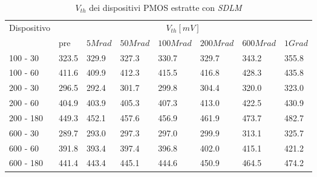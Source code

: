 \documentclass[12pt, letterpaper]{book}
\begin{document}
\begin{table}[H]
  \renewcommand{\arraystretch}{1.3}
  \begin{tabular}{m{2cm} m{0.8cm} m{1.1cm} m{1.3cm} m{1.5cm} m{1.5cm} m{1.5cm} m{1cm}}
    \toprule
    \multirow{2}{*}{Dispositivo} & \multicolumn{7}{c}{$V_{th} [mV] $}                                                                    \\
    \cmidrule{2-8}
                                 & pre                                & $5Mrad$ & $50Mrad$ & $100Mrad$ & $200Mrad$ & $600Mrad$ & $1Grad$ \\
    \midrule
    100 - 30                     & 323.5                              & 329.9   & 327.3    & 330.7     & 329.7     & 343.2     & 355.8   \\
    \hline
    100 - 60                     & 411.6                              & 409.9   & 412.3    & 415.5     & 416.8     & 428.3     & 435.8   \\
    \hline
    200 - 30                     & 296.5                              & 292.4   & 301.7    & 299.8     & 304.4     & 320.0     & 323.0   \\
    \hline
    200 - 60                     & 404.9                              & 403.9   & 405.3    & 407.3     & 413.0     & 422.5     & 430.9   \\
    \hline
    200 - 180                    & 449.3                              & 452.1   & 457.6    & 456.9     & 461.9     & 473.7     & 482.7   \\
    \hline
    600 - 30                     & 289.7                              & 293.0   & 297.3    & 297.0     & 299.9     & 313.1     & 325.7   \\
    \hline
    600 - 60                     & 391.8                              & 393.4   & 397.4    & 396.8     & 402.0     & 415.1     & 421.2   \\
    \hline
    600 - 180                    & 441.4                              & 443.4   & 445.1    & 444.6     & 450.9     & 464.5     & 474.2   \\
    \bottomrule
  \end{tabular}
  \caption{$V_{th}$ dei dispositivi PMOS estratte con \emph{SDLM}}
  \label{tab:VthSDLMP}
\end{table}
\end{document}
